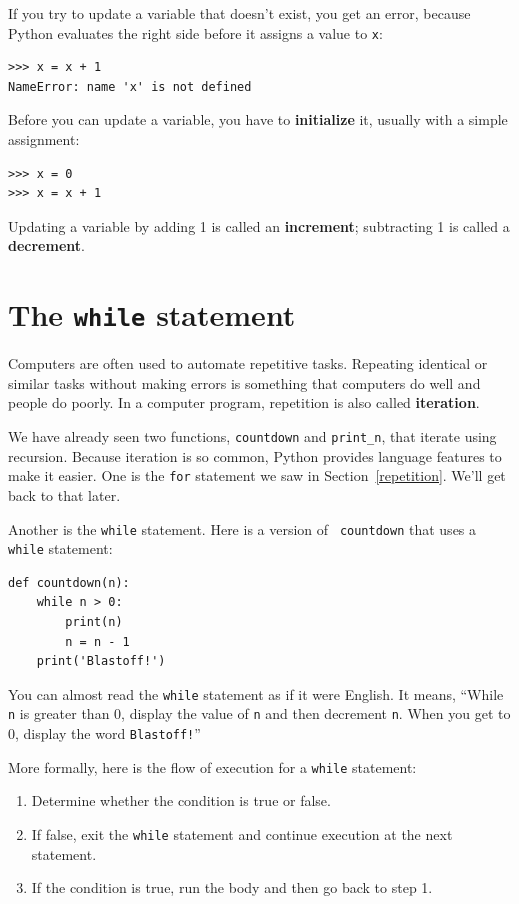 \documentclass[10pt]{book}
\begin{document}
If you try to update a variable that doesn't exist, you get an
error, because Python evaluates the right side before it assigns
a value to {\tt x}:

\begin{verbatim}
>>> x = x + 1
NameError: name 'x' is not defined
\end{verbatim}
%
Before you can update a variable, you have to {\bf initialize}
it, usually with a simple assignment:

\begin{verbatim}
>>> x = 0
>>> x = x + 1
\end{verbatim}
%
Updating a variable by adding 1 is called an {\bf increment};
subtracting 1 is called a {\bf decrement}.




\section{The {\tt while} statement}

Computers are often used to automate repetitive tasks.  Repeating
identical or similar tasks without making errors is something that
computers do well and people do poorly.  In a computer program,
repetition is also called {\bf iteration}.

We have already seen two functions, {\tt countdown} and
\verb"print_n", that iterate using recursion.  Because iteration is so
common, Python provides language features to make it easier.
One is the {\tt for} statement we saw in Section~\ref{repetition}.
We'll get back to that later.

Another is the {\tt while} statement.  Here is a version of {\tt
countdown} that uses a {\tt while} statement:

\begin{verbatim}
def countdown(n):
    while n > 0:
        print(n)
        n = n - 1
    print('Blastoff!')
\end{verbatim}
%
You can almost read the {\tt while} statement as if it were English.
It means, ``While {\tt n} is greater than 0,
display the value of {\tt n} and then decrement
{\tt n}.  When you get to 0, display the word {\tt Blastoff!}''

More formally, here is the flow of execution for a {\tt while} statement:

\begin{enumerate}

\item Determine whether the condition is true or false.

\item If false, exit the {\tt while} statement
and continue execution at the next statement.

\item If the condition is true, run the
body and then go back to step 1.

\end{enumerate}
\end{document}
